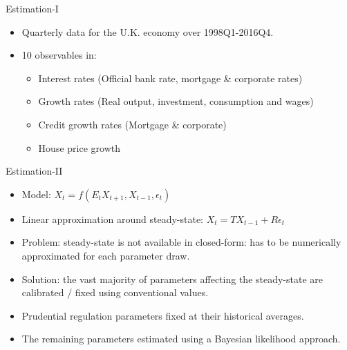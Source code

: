 \documentclass[8pt,aspectratio=169]{beamer}
\numberwithin{equation}{section}
\begin{document}
\begin{frame}{Estimation-I}


\begin{itemize}

\item Quarterly data for the U.K. economy over 1998Q1-2016Q4. 
\vspace{5 mm}
\item 10 observables in: 
\vspace{5 mm}
\begin{itemize}
\item Interest rates (Official bank rate, mortgage \& corporate rates)
\vspace{3 mm}
\item Growth rates (Real output, investment, consumption and wages)
\vspace{3 mm}
\item Credit growth rates (Mortgage \& corporate) 
\vspace{3 mm}
\item House price growth
\end{itemize}

\end{itemize}



\end{frame}


\begin{frame}{Estimation-II}

\begin{itemize}

\item Model: $X_t = f(E_tX_{t+1},X_{t-1},\epsilon_t) $
\vspace{5 mm}
\item Linear approximation around steady-state: $X_t = T X_{t-1} + R \epsilon_t $
\vspace{5 mm}
\item Problem: steady-state is not available in closed-form:  has to be numerically approximated for each parameter draw. 
\vspace{5 mm}
\item Solution: the vast majority of parameters affecting the steady-state are calibrated / fixed using conventional values. 
\vspace{5 mm}
\item Prudential regulation parameters fixed at their historical averages. 
\item The remaining parameters estimated using a Bayesian likelihood approach. 

\end{itemize}




\end{frame}
\end{document}
